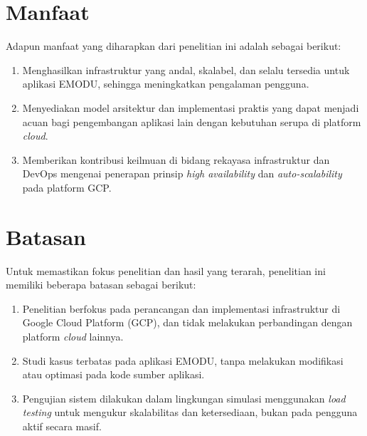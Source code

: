 \section{Manfaat}

{Adapun manfaat yang diharapkan dari penelitian ini adalah sebagai
berikut:}

\begin{enumerate}
  \item
    {Menghasilkan infrastruktur yang andal, skalabel, dan selalu tersedia untuk aplikasi EMODU, sehingga meningkatkan pengalaman pengguna.}
  \item
    {Menyediakan model arsitektur dan implementasi praktis yang dapat menjadi acuan bagi pengembangan aplikasi lain dengan kebutuhan serupa di platform \textit{cloud}.}
  \item
    {Memberikan kontribusi keilmuan di bidang rekayasa infrastruktur dan DevOps mengenai penerapan prinsip \textit{high availability} dan \textit{auto-scalability} pada platform GCP.}
\end{enumerate}

\section{Batasan}

{Untuk memastikan fokus penelitian dan hasil yang terarah, penelitian
ini memiliki beberapa batasan sebagai berikut:}

\begin{enumerate}
  \item
    {Penelitian berfokus pada perancangan dan implementasi infrastruktur di Google Cloud Platform (GCP), dan tidak melakukan perbandingan dengan platform \textit{cloud} lainnya.}
  \item
    {Studi kasus terbatas pada aplikasi EMODU, tanpa melakukan modifikasi atau optimasi pada kode sumber aplikasi.}
  \item
    {Pengujian sistem dilakukan dalam lingkungan simulasi menggunakan \textit{load testing} untuk mengukur skalabilitas dan ketersediaan, bukan pada pengguna aktif secara masif.}
\end{enumerate}
